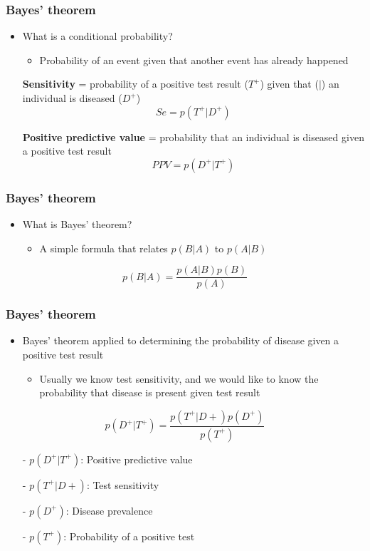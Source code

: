 \documentclass{beamer}
\begin{document}
\begin{frame}
\frametitle{Bayes’ theorem}
\begin{itemize}
 \item{What is a conditional probability?}
 \begin{itemize}
  \item{Probability of an event given that another event has already happened}
 \end{itemize}
  \medskip
  \item[]{\textbf{Sensitivity} = probability of a positive test result ($T^+$) given that ($|$) an individual is diseased ($D^+$)}
$$Se = p(T^+|D^+)$$
  \item[]{\textbf{Positive predictive value} = probability that an individual is diseased given a positive test result}
  $$PPV = p(D^+|T^+)$$
\end{itemize}
\end{frame}

\begin{frame}
\frametitle{Bayes’ theorem}
\begin{itemize}
 \item{What is Bayes’ theorem?}
 \begin{itemize}
  \item{A simple formula that relates $p(B|A)$ to $p(A|B)$}
 \end{itemize}
\end{itemize}
\vspace{1.5cm}
\huge
$$p(B|A)=\frac{p(A|B)p(B)}{p(A)}$$
\end{frame}

\begin{frame}
\frametitle{Bayes’ theorem}
\begin{itemize}
 \item{Bayes’ theorem applied to determining the probability of disease given a positive test result}
 \begin{itemize}
  \item{Usually we know test sensitivity, and we would like to know the probability that disease is present given test result}
 \end{itemize}
\end{itemize}
\vspace{1cm}
\begin{large}
$$p(D^+|T^+)=\frac{p(T^+|D+)p(D^+)}{p(T^+)}$$
\end{large}
\begin{itemize}
 \item[-]{$p(D^+|T^+)$: Positive predictive value}
 \item[-]{$p(T^+|D+)$: Test sensitivity}
 \item[-]{$p(D^+)$: Disease prevalence}
 \item[-]{$p(T^+)$: Probability of a positive test}
\end{itemize}
\end{frame}
\end{document}
